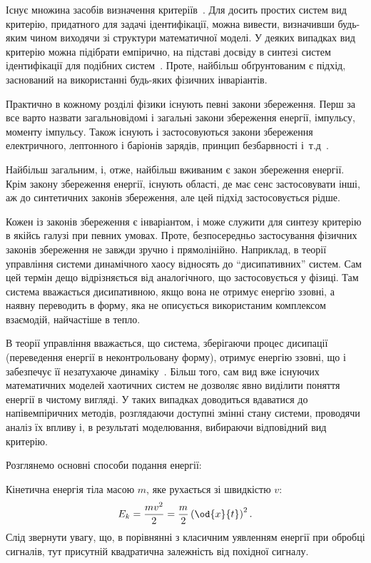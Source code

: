Існує множина засобів визначення
критеріїв~\cite{atu_asau11,atu_asau12,atu_asau14,atu_khar_autodor25,atu_asau18,atu_st79,atu_apir2013}.
Для досить простих систем вид критерію, придатного для задачі ідентифікації,
можна вивести, визначивши будь-яким чином виходячи зі структури математичної
моделі. У деяких випадках вид критерію можна підібрати емпірично, на
підставі досвіду в синтезі систем ідентифікації для подібних систем~\cite{atu_asau24}. Проте,
найбільш обґрунтованим є підхід, заснований на використанні будь-яких фізичних
інваріантів.



Практично в кожному розділі фізики існують певні закони
збереження. Перш за все варто назвати загальновідомі і загальні
закони збереження енергії, імпульсу, моменту імпульсу. Також
існують і застосовуються закони збереження електричного,
лептонного і баріонів зарядів, принцип безбарвності
і~т.д~\cite{vigner_invar}.

Найбільш загальним, і, отже, найбільш вживаним є закон збереження енергії.
Крім закону збереження енергії, існують області, де має сенс
застосовувати інші, аж до синтетичних законів збереження, але
цей підхід застосовується рідше.

Кожен із законів збереження є інваріантом, і може служити для
синтезу критерію в якійсь галузі при певних умовах. Проте,
безпосередньо застосування фізичних законів збереження не
завжди зручно і прямолінійно. Наприклад, в теорії управління
системи динамічного хаосу відносять до ``дисипативних''
систем. Сам цей термін дещо відрізняється від аналогічного, що
застосовується у фізиці. Там система вважається дисипативною,
якщо вона не отримує енергію ззовні,
а наявну переводить в форму, яка не
описується використаним комплексом взаємодій, найчастіше
в тепло.

В теорії управління вважається, що система, зберігаючи
процес дисипації (переведення енергії в неконтрольовану
форму), отримує енергію ззовні, що і забезпечує її незатухаюче
динаміку~\cite{prigogine_selforganization, chernavskii_syn_info, prigogine_order_from_chaos}. Більш
того, сам вид вже існуючих математичних моделей хаотичних систем
не дозволяє явно виділити поняття енергії в чистому вигляді. У
таких випадках доводиться вдаватися до напівемпіричних методів,
розглядаючи доступні змінні стану системи, проводячи аналіз
їх впливу і, в результаті моделювання, вибираючи відповідний
вид критерію.


Розглянемо основні способи подання енергії:

Кінетична енергія тіла масою $m$, яке рухається зі швидкістю $v$:
%
\begin{equation}
  E_k = \frac{mv^2}{2} = \frac{m}{2} \left( \od{x}{t} \right)^2.
  \label{atu:eq:Ek_v}
\end{equation}
%
Слід звернути увагу, що, в порівнянні з класичним уявленням
енергії при обробці сигналів, тут присутній квадратична
залежність від похідної сигналу.

